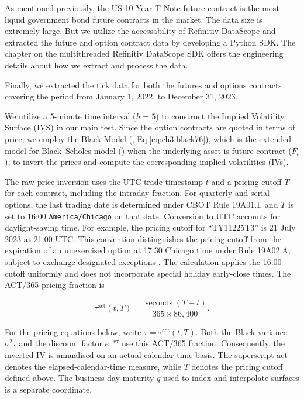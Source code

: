 As mentioned previously, the US 10-Year T-Note future contract is the most liquid government bond future contracts in the market. The data size is extremely large. But we utilize the accessability of Refinitiv DataScope and extracted the future and option contract data by developing a Python SDK. The chapter on the multithreaded Refinitiv DataScope SDK offers the engineering details about how we extract and process the data.


Finally, we extracted the tick data for both the futures and options contracts covering the period from January 1, 2022, to December 31, 2023. 


We utilize a 5-minute time interval ($h=5$) to construct the Implied Volatility Surface (IVS) in our main test. Since the option contracts are quoted in terms of price, we employ the Black Model (\cite{black76}, Eq.\ref{eq:ch3:black76}), which is the extended model for Black–Scholes model (\cite{BlackScholes:1973}) when the underlying asset is future contract ($F_t$), to invert the prices and compute the corresponding implied volatilities (IVs).

The raw-price inversion uses the UTC trade timestamp \(t\) and a pricing cutoff \(T\) for each contract, including the intraday fraction. For quarterly and serial options, the last trading date is determined under CBOT Rule 19A01.I, and \(T\) is set to 16:00 \texttt{America/Chicago} on that date. Conversion to UTC accounts for daylight-saving time. For example, the pricing cutoff for ``TY11225T3'' is 21 July 2023 at 21:00 UTC. This convention distinguishes the pricing cutoff from the expiration of an unexercised option at 17:30 Chicago time under Rule 19A02.A, subject to exchange-designated exceptions \citep{cme_tnote_options_rules}. The calculation applies the 16:00 cutoff uniformly and does not incorporate special holiday early-close times. The ACT/365 pricing fraction is

\begin{equation}\label{eq:ch3:pricing_clock}
\tau^{\mathrm{act}}(t,T)
=\frac{\operatorname{seconds}(T-t)}{365\times86{,}400}.
\end{equation}

For the pricing equations below, write \(\tau=\tau^{\mathrm{act}}(t,T)\). Both the Black variance \(\sigma^2\tau\) and the discount factor \(e^{-r\tau}\) use this ACT/365 fraction. Consequently, the inverted IV is annualised on an actual-calendar-time basis. The superscript \(\mathrm{act}\) denotes the elapsed-calendar-time measure, while \(T\) denotes the pricing cutoff defined above. The business-day maturity \(q\) used to index and interpolate surfaces is a separate coordinate.


